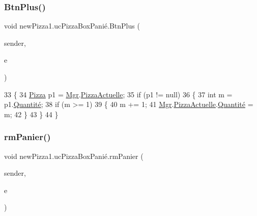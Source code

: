 \subsubsection{\texorpdfstring{Btn\+Plus()}{BtnPlus()}}
{\footnotesize\ttfamily void new\+Pizza1.\+uc\+Pizza\+Box\+Panié.\+Btn\+Plus (\begin{DoxyParamCaption}\item[{object}]{sender,  }\item[{Routed\+Event\+Args}]{e }\end{DoxyParamCaption})\hspace{0.3cm}{\ttfamily [inline]}}


\begin{DoxyCode}
33         \{
34             \hyperlink{classModele_1_1Pizza}{Pizza} p1 = \hyperlink{classnewPizza1_1_1ucPizzaBoxPani_xC3_xA9_a8bf5e4ad9d5295a1d0b9ea6274f7d13f}{Mgr}.\hyperlink{classModele_1_1Manager_a7e69844aeeebbc80144850efc0d2b94c}{PizzaActuelle};
35             \textcolor{keywordflow}{if} (p1 != null)
36             \{
37                 \textcolor{keywordtype}{int} m = p1.\hyperlink{classModele_1_1Pizza_ae755ca79feb6f9a522aa18544c3f1310}{Quantité};
38                 \textcolor{keywordflow}{if} (m >= 1)
39                 \{
40                     m += 1;
41                     \hyperlink{classnewPizza1_1_1ucPizzaBoxPani_xC3_xA9_a8bf5e4ad9d5295a1d0b9ea6274f7d13f}{Mgr}.\hyperlink{classModele_1_1Manager_a7e69844aeeebbc80144850efc0d2b94c}{PizzaActuelle}.\hyperlink{classModele_1_1Pizza_ae755ca79feb6f9a522aa18544c3f1310}{Quantité} = m;
42                 \}
43             \}
44         \}
\end{DoxyCode}
\mbox{\label{classnewPizza1_1_1ucPizzaBoxPani_xC3_xA9_a54708dc95183cabe08a0182b79305aeb}} 
\subsubsection{\texorpdfstring{rm\+Panier()}{rmPanier()}}
{\footnotesize\ttfamily void new\+Pizza1.\+uc\+Pizza\+Box\+Panié.\+rm\+Panier (\begin{DoxyParamCaption}\item[{object}]{sender,  }\item[{Routed\+Event\+Args}]{e }\end{DoxyParamCaption})\hspace{0.3cm}{\ttfamily [inline]}}



